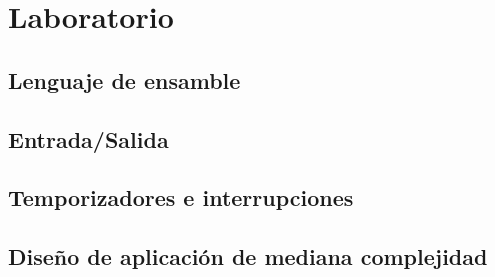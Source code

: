 \documentclass[a4paper]{book}
\begin{document}
\chapter{Laboratorio}

\section{Lenguaje de ensamble}

\section{Entrada/Salida}

\section{Temporizadores e interrupciones}

\section{Diseño de aplicación de mediana complejidad}



% 
\end{document}
